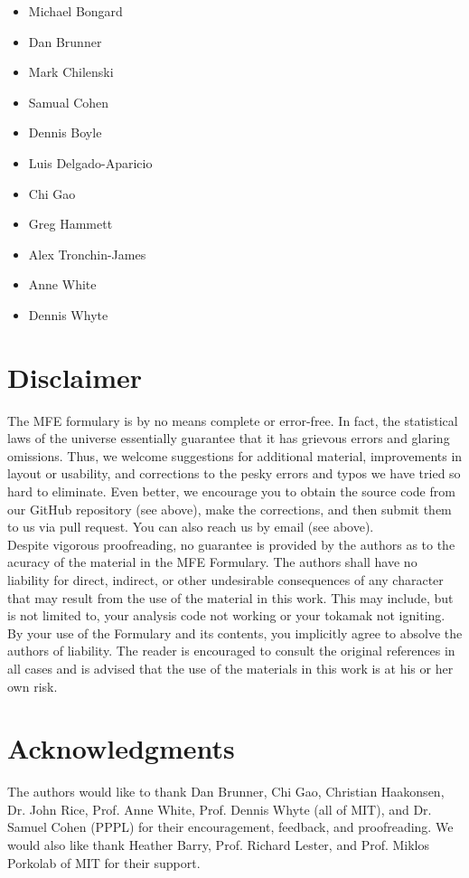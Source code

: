\begin{multicols}{2}
\begin{itemize}
\item Michael Bongard
\item Dan Brunner
\item Mark Chilenski
\item Samual Cohen
\item Dennis Boyle
\item Luis Delgado-Aparicio
\item Chi Gao
\item Greg Hammett 
\item Alex Tronchin-James
\item Anne White
\item Dennis Whyte 
\end{itemize}
\end{multicols}


\section*{Disclaimer}
The MFE formulary is by no means complete or error-free. In fact, the
statistical laws of the universe essentially guarantee that it has
grievous errors and glaring omissions. Thus, we welcome suggestions
for additional material, improvements in layout or usability, and
corrections to the pesky errors and typos we have tried so hard to
eliminate. Even better, we encourage you to obtain the source code
from our GitHub repository (see above), make the corrections, and then
submit them to us via pull request. You can also reach us by email
(see above).\\

\noindent
Despite vigorous proofreading, no guarantee is provided by the authors
as to the acuracy of the material in the MFE Formulary. The authors
shall have no liability for direct, indirect, or other undesirable
consequences of any character that may result from the use of the
material in this work. This may include, but is not limited to, your
analysis code not working or your tokamak not igniting. By your use of
the Formulary and its contents, you implicitly agree to absolve the
authors of liability. The reader is encouraged to consult the original
references in all cases and is advised that the use of the materials
in this work is at his or her own risk.

\section*{Acknowledgments}
The authors would like to thank Dan Brunner, Chi Gao, Christian
Haakonsen, Dr. John Rice, Prof. Anne White, Prof. Dennis Whyte (all of
MIT), and Dr. Samuel Cohen (PPPL) for their encouragement, feedback,
and proofreading. We would also like thank Heather Barry,
Prof. Richard Lester, and Prof. Miklos Porkolab of MIT for their
support.\\

